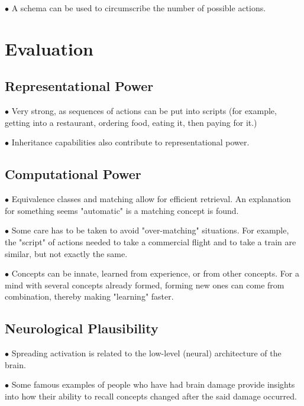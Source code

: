 \documentclass[english,openany]{book}
\begin{document}
$\bullet$ A schema can be used to circumscribe the number of possible actions.

\section{Evaluation}

\subsection{Representational Power}

$\bullet$ Very strong, as sequences of actions can be put into scripts (for example, getting into a restaurant, ordering food, eating it, then paying for it.)

$\bullet$ Inheritance capabilities also contribute to representational power.

\subsection{Computational Power}

$\bullet$ Equivalence classes and matching allow for efficient retrieval. An explanation for something seems "automatic" is a matching concept is found.

$\bullet$ Some care has to be taken to avoid "over-matching" situations. For example, the "script" of actions needed to take a commercial flight and to take a train are similar, but not exactly the same.

$\bullet$ Concepts can be innate, learned from experience, or from other concepts. For a mind with several concepts already formed, forming new ones can come from combination, thereby making "learning" faster.

\subsection{Neurological Plausibility}

$\bullet$ Spreading activation is related to the low-level (neural) architecture of the brain.

$\bullet$ Some famous examples of people who have had brain damage provide insights into how their ability to recall concepts changed after the said damage occurred.
\end{document}
